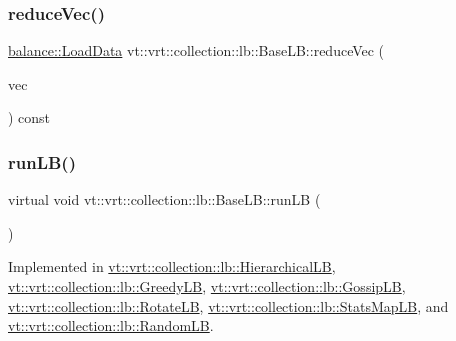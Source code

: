 \subsubsection{\texorpdfstring{reduce\+Vec()}{reduceVec()}}
{\footnotesize\ttfamily \hyperlink{structvt_1_1vrt_1_1collection_1_1balance_1_1_load_data}{balance\+::\+Load\+Data} vt\+::vrt\+::collection\+::lb\+::\+Base\+L\+B\+::reduce\+Vec (\begin{DoxyParamCaption}\item[{std\+::vector$<$ \hyperlink{structvt_1_1vrt_1_1collection_1_1balance_1_1_load_data}{balance\+::\+Load\+Data} $>$ \&\&}]{vec }\end{DoxyParamCaption}) const\hspace{0.3cm}{\ttfamily [protected]}}

\mbox{\label{structvt_1_1vrt_1_1collection_1_1lb_1_1_base_l_b_a69a398c54f8129f365171a1189ffcd84}} 
\subsubsection{\texorpdfstring{run\+L\+B()}{runLB()}}
{\footnotesize\ttfamily virtual void vt\+::vrt\+::collection\+::lb\+::\+Base\+L\+B\+::run\+LB (\begin{DoxyParamCaption}{ }\end{DoxyParamCaption})\hspace{0.3cm}{\ttfamily [pure virtual]}}



Implemented in \hyperlink{structvt_1_1vrt_1_1collection_1_1lb_1_1_hierarchical_l_b_a6affae1554d9c0734db0d538b9b26e4d}{vt\+::vrt\+::collection\+::lb\+::\+Hierarchical\+LB}, \hyperlink{structvt_1_1vrt_1_1collection_1_1lb_1_1_greedy_l_b_ab5e726f6fe7aa749ea6e0e2a45171d36}{vt\+::vrt\+::collection\+::lb\+::\+Greedy\+LB}, \hyperlink{structvt_1_1vrt_1_1collection_1_1lb_1_1_gossip_l_b_a06116496c3146be18c56379775f8715d}{vt\+::vrt\+::collection\+::lb\+::\+Gossip\+LB}, \hyperlink{structvt_1_1vrt_1_1collection_1_1lb_1_1_rotate_l_b_a853cb29e5dbe8164ad96a33fade9cc44}{vt\+::vrt\+::collection\+::lb\+::\+Rotate\+LB}, \hyperlink{structvt_1_1vrt_1_1collection_1_1lb_1_1_stats_map_l_b_a20a7bd354dcaca4393c66034be3b4083}{vt\+::vrt\+::collection\+::lb\+::\+Stats\+Map\+LB}, and \hyperlink{structvt_1_1vrt_1_1collection_1_1lb_1_1_random_l_b_a7354965590d0ab010841a2a9086ce7e8}{vt\+::vrt\+::collection\+::lb\+::\+Random\+LB}.

